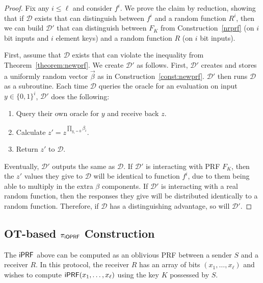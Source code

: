 \begin{proof}
Fix any $i\leq\ell$ and consider $f^i$.  We prove the claim by
reduction, showing that if $\mathcal{D}$ exists that can distinguish
between $f^i$ and a random function $R^i$, then we can build
$\mathcal{D}'$ that can distinguish between $F_K$ from
Construction~\ref{nrprf} (on $i$ bit inputs and $i$ element keys) and a
random function $R$ (on $i$ bit inputs).

First, assume that $\mathcal{D}$ exists that can violate the
inequality from Theorem~\ref{theorem:newprf}.  We create
$\mathcal{D'}$ as follows.  First, $\mathcal{D}'$ creates and stores a
uniformly random vector $\vec{\beta}$ as in
Construction~\ref{const:newprf}.  $\mathcal{D}'$ then runs
$\mathcal{D}$ as a subroutine.  Each time $\mathcal{D}$ queries the
oracle for an evaluation on input $y\in\{0,1\}^i$, $\mathcal{D}'$ does the
following:

\begin{enumerate}
\item Query their own oracle for $y$ and receive back $z$.
\item Calculate $z' = z^{\prod_{y_i = 0} \beta_i}$.
\item Return $z'$ to $\mathcal{D}$.
\end{enumerate}

Eventually, $\mathcal{D}'$ outputs the same as $\mathcal{D}$.  If
$\mathcal{D}'$ is interacting with PRF $F_K$, then the $z'$ values
they give to $\mathcal{D}$ will be identical to function $f^i$, due to
them being able to multiply in the extra $\beta$ components.  If
$\mathcal{D}'$ is interacting with a real random function, then the
responses they give will be distributed identically to a random
function.   Therefore, if $\mathcal{D}$ has a distinguishing
advantage, so will $\mathcal{D}'$.
\end{proof}





\subsection{OT-based ${\pi_{\mathsf{i}\mathsf{OPRF}}}$ Construction}

The $\mathsf{i}\mathsf{PRF}$ above can be computed as an oblivious PRF between a sender $S$ and a receiver $R$.  In this protocol,
the receiver $R$ has an array of bits $(x_1, \ldots, x_\ell)$ and wishes to compute $\mathsf{i}\mathsf{PRF}(x_1, \ldots, x_\ell)$ using
the key $K$ possessed by $S$.

